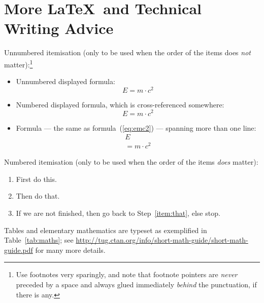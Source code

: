 \section*{More \LaTeX\ and Technical Writing Advice}

Unnumbered itemisation (only to be used when the order of the items
does \emph{not} matter):\footnote{Use footnotes very sparingly, and
  note that footnote pointers are \emph{never} preceded by a space and
  always glued immediately \emph{behind} the punctuation, if there is
  any.}
\begin{itemize}
\item Unnumbered displayed formula:
  \[
  E = m \cdot c^2
  \]
\item Numbered displayed formula, which is cross-referenced somewhere:
  \begin{equation}
    \label{eq:emc2}
    E = m \cdot c^2
  \end{equation}
\item Formula --- the same as formula~(\ref{eq:emc2}) --- spanning
  more than one line:
  \begin{gather*}
    E \\ = m \cdot c^2
  \end{gather*}  
\end{itemize}
Numbered itemisation (only to be used when the order of the items
\emph{does} matter):
\begin{enumerate}
\item First do this.
\item\label{item:that} Then do that.
\item If we are not finished, then go back to Step~\ref{item:that},
  else stop.
\end{enumerate}

Tables and elementary mathematics are typeset as exemplified in
Table~\ref{tab:maths}; see
\url{http://tug.ctan.org/info/short-math-guide/short-math-guide.pdf}
for many more details.

